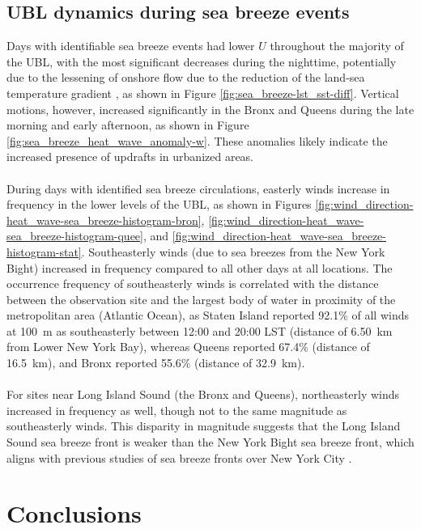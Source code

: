 \documentclass[11pt,a4paper]{article}
\begin{document}
\subsection{UBL dynamics during sea breeze events}
Days with identifiable sea breeze events had lower $U$ throughout the majority of the UBL, with the most significant decreases during the nighttime, potentially due to the lessening of onshore flow due to the reduction of the land-sea temperature gradient \citep{pullen2007}, as shown in Figure \ref{fig:sea_breeze-lst_sst-diff}. Vertical motions, however, increased significantly in the Bronx and Queens during the late morning and early afternoon, as shown in Figure \ref{fig:sea_breeze_heat_wave_anomaly-w}. These anomalies likely indicate the increased presence of updrafts in urbanized areas.
\\ \\
During days with identified sea breeze circulations, easterly winds increase in frequency in the lower levels of the UBL, as shown in Figures \ref{fig:wind_direction-heat_wave-sea_breeze-histogram-bron}, \ref{fig:wind_direction-heat_wave-sea_breeze-histogram-quee}, and \ref{fig:wind_direction-heat_wave-sea_breeze-histogram-stat}. Southeasterly winds (due to sea breezes from the New York Bight) increased in frequency compared to all other days at all locations. The occurrence frequency of southeasterly winds is correlated with the distance between the observation site and the largest body of water in proximity of the metropolitan area (Atlantic Ocean), as Staten Island reported 92.1\% of all winds at \SI{100}{\meter} as southeasterly between 12:00 and 20:00 LST (distance of \SI{6.50}{\kilo\meter} from Lower New York Bay), whereas Queens reported 67.4\% (distance of \SI{16.5}{\kilo\meter}), and Bronx reported 55.6\% (distance of \SI{32.9}{\kilo\meter}). 
\\ \\
For sites near Long Island Sound (the Bronx and Queens), northeasterly winds increased in frequency as well, though not to the same magnitude as southeasterly winds. This disparity in magnitude suggests that the Long Island Sound sea breeze front is weaker than the New York Bight sea breeze front, which aligns with previous studies of sea breeze fronts over New York City \citep{frizzola1963, meir2013}. 

\section{Conclusions}
\end{document}
